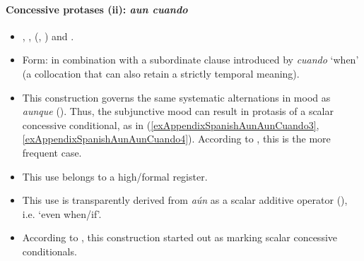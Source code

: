 \paragraph{Concessive protases (ii): \textit{aun cuando}}
\label{appendixSpanishAunCuando}
\begin{itemize}
	\item \textcite{Elvira2005}, \textcite{FlamencoGarcia1999}, \citeauthor{RAEGramatica} (\citeyear[§47.12g]{RAEGramatica}, \citeyear[s.v. \textit{aun}]{RAEDictionary}) and \textcite{Trujillo1990}.
	\item  Form: in combination with a subordinate clause introduced by \textit{cuando} \lq when' (a collocation that can also retain a strictly temporal meaning).
	\item This construction governs the same systematic alternations in mood as \textit{aunque} (). Thus, the subjunctive mood can result in protasis of a scalar concessive conditional, as in (\ref{exAppendixSpanishAunAunCuando3}, \ref{exAppendixSpanishAunAunCuando4}). According to \textcite[§47.12.g]{RAEGramatica}, this is the more frequent case.
	\item This use belongs to a high/formal register.
	\item This use is transparently derived from \textit{aún} as a scalar additive operator (), i.e. \lq even when/if'.
	\item According to \textcite{Elvira2005}, this construction started out as marking scalar concessive conditionals.
\end{itemize}
\pagebreak
